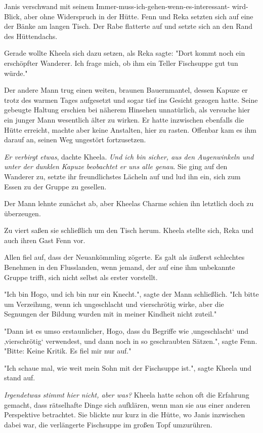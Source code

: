 \documentclass[10pt, a4paper, oneside]{book}
\begin{document}
\begin{multicols}{2}
Janis verschwand mit seinem Immer-muss-ich-gehen-wenn-es-interessant- wird-Blick, aber ohne Widerspruch in der Hütte. Fenn und Reka setzten sich auf eine der Bänke am langen Tisch. Der Rabe flatterte auf und setzte sich an den Rand des Hüttendachs. 

Gerade wollte Kheela sich dazu setzen, als Reka sagte: "Dort kommt noch ein erschöpfter Wanderer. Ich frage mich, ob ihm ein Teller Fischsuppe gut tun würde." 

Der andere Mann trug einen weiten, braunen Bauernmantel, dessen Kapuze er trotz des warmen Tages aufgesetzt und sogar tief ins Gesicht gezogen hatte. Seine gebeugte Haltung erschien bei näherem Hinsehen unnatürlich, als versuche hier ein junger Mann wesentlich älter zu wirken. Er hatte inzwischen ebenfalls die Hütte erreicht, machte aber keine Anstalten, hier zu rasten. Offenbar kam es ihm darauf an, seinen Weg ungestört fortzusetzen. 

\textit{Er verbirgt etwas}, dachte Kheela. \textit{Und ich bin sicher, aus den Augenwinkeln und unter der dunklen Kapuze beobachtet er uns alle genau}. Sie ging auf den Wanderer zu, setzte ihr freundlichstes Lächeln auf und lud ihn ein, sich zum Essen zu der Gruppe zu gesellen. 

Der Mann lehnte zunächst ab, aber Kheelas Charme schien ihn letztlich doch zu überzeugen. 

Zu viert saßen sie schließlich um den Tisch herum. Kheela stellte sich, Reka und auch ihren Gast Fenn vor. 

Allen fiel auf, dass der Neuankömmling zögerte. Es galt als äußerst schlechtes Benehmen in den Flusslanden, wenn jemand, der auf eine ihm unbekannte Gruppe trifft, sich nicht selbst als erster vorstellt. 

"Ich bin Hogo, und ich bin nur ein Knecht.", sagte der Mann schließlich. "Ich bitte um Verzeihung, wenn ich ungeschlacht und vierschrötig wirke, aber die Segnungen der Bildung wurden mit in meiner Kindheit nicht zuteil." 

"Dann ist es umso erstaunlicher, Hogo, dass du Begriffe wie ‚ungeschlacht‘ und ‚vierschrötig‘ verwendest, und dann noch in so geschraubten Sätzen.", sagte Fenn. "Bitte: Keine Kritik. Es fiel mir nur auf." 

"Ich schaue mal, wie weit mein Sohn mit der Fischsuppe ist.", sagte Kheela und stand auf. 

\textit{Irgendetwas stimmt hier nicht, aber was?} Kheela hatte schon oft die Erfahrung gemacht, dass rätselhafte Dinge sich aufklären, wenn man sie aus einer anderen Perspektive betrachtet. Sie blickte nur kurz in die Hütte, wo Janis inzwischen dabei war, die verlängerte Fischsuppe im großen Topf umzurühren. 


\end{multicols}
\end{document}
